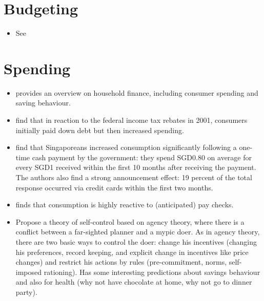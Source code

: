 \documentclass[a4paper, 11pt]{report}
\begin{document}
\section{Budgeting}

\begin{itemize}
	\item See \citet{ameriks2003wealth}
\end{itemize}


\section{Spending}

\begin{itemize}
	\item \citet{agarwal2017shapes} provides an overview on household finance, including consumer spending and saving behaviour.

	\item \citet{agarwal2007reaction} find that in reaction to the federal income tax rebates in 2001, consumers initially paid down debt but then increased spending.

	\item \citet{agarwal2014consumption} find that Singaporeans increased consumption significantly following a one-time cash payment by the government: they spend SGD0.80 on average for every SGD1 received within the first 10 months after receiving the payment. The authors also find a strong announcement effect: 19 percent of the total response occurred via credit cards within the first two months.

	\item \citet{stephens2006paycheque} finds that consumption is highly reactive to (anticipated) pay checks.

	\item \citet{thaler1981economic} Propose a theory of self-control based on agency theory, where there is a conflict between a far-sighted planner and a mypic doer. As in agency theory, there are two basic ways to control the doer: change his incentives (changing his preferences, record keeping, and explicit change in incentives like price changes) and restrict his actions by rules (pre-commitment, norms, self-imposed rationing). Has some interesting predictions about savings behaviour and also for health (why not have chocolate at home, why not go to dinner party).

\end{itemize}
\end{document}
